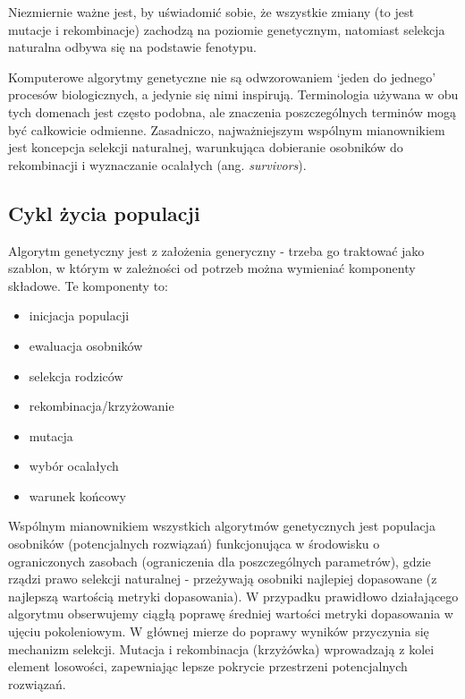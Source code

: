 \documentclass[a4paper,11pt]{article}
\begin{document}
    \bigskip

    Niezmiernie ważne jest, by uświadomić sobie, że wszystkie zmiany (to jest mutacje i rekombinacje) zachodzą na poziomie genetycznym, natomiast selekcja naturalna odbywa się na podstawie fenotypu\cite{IntroductionToEvolutionaryComputing2015}.

    \bigskip

    Komputerowe algorytmy genetyczne nie są odwzorowaniem `jeden do jednego' procesów biologicznych, a jedynie się nimi inspirują. Terminologia używana w obu tych domenach jest często podobna, ale znaczenia poszczególnych terminów mogą być całkowicie odmienne. Zasadniczo, najważniejszym wspólnym mianownikiem jest koncepcja selekcji naturalnej, warunkująca dobieranie osobników do rekombinacji i wyznaczanie ocalałych (ang. \textit{survivors}).

    \subsection{Cykl życia populacji}

    \noindent
    \begin{minipage}[H]{\textwidth}
        \setlength\parindent{17pt} Algorytm genetyczny jest z założenia generyczny - trzeba go traktować jako szablon, w którym w zależności od potrzeb można wymieniać komponenty składowe. Te komponenty to:
        \begin{itemize}
            \item inicjacja populacji
            \item ewaluacja osobników
            \item selekcja rodziców
            \item rekombinacja/krzyżowanie
            \item mutacja
            \item wybór ocalałych
            \item warunek końcowy
        \end{itemize}
    \end{minipage}

    \bigskip

    Wspólnym mianownikiem wszystkich algorytmów genetycznych jest populacja osobników (potencjalnych rozwiązań) funkcjonująca w środowisku o ograniczonych zasobach (ograniczenia dla poszczególnych parametrów), gdzie rządzi prawo selekcji naturalnej - przeżywają osobniki najlepiej dopasowane (z najlepszą wartością metryki dopasowania)\cite{IntroductionToEvolutionaryComputing2015}. W przypadku prawidłowo działającego algorytmu obserwujemy ciągłą poprawę średniej wartości metryki dopasowania w ujęciu pokoleniowym. W głównej mierze do poprawy wyników przyczynia się mechanizm selekcji. Mutacja i rekombinacja (krzyżówka) wprowadzają z kolei element losowości, zapewniając lepsze pokrycie przestrzeni potencjalnych rozwiązań.
\end{document}
